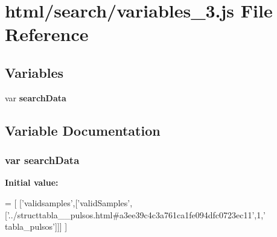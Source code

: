 \section{html/search/variables\+\_\+3.js File Reference}
\label{variables__3_8js}
\subsection*{Variables}
\begin{DoxyCompactItemize}
\item 
var {\bf search\+Data}
\end{DoxyCompactItemize}


\subsection{Variable Documentation}
\subsubsection[{search\+Data}]{\setlength{\rightskip}{0pt plus 5cm}var search\+Data}\label{variables__3_8js_ad01a7523f103d6242ef9b0451861231e}
{\bfseries Initial value\+:}
\begin{DoxyCode}
=
[
  [\textcolor{stringliteral}{'validsamples'},[\textcolor{stringliteral}{'validSamples'},[\textcolor{stringliteral}{'../structtabla\_\_pulsos.html#a3ee39c4c3a761ca1fe094dfc0723ec11'},1,\textcolor{stringliteral}{'
      tabla\_pulsos'}]]]
]
\end{DoxyCode}
